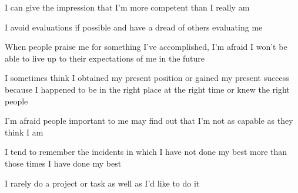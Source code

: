 \documentclass[aspectratio=169]{beamer}
\begin{document}
\begin{frame}
  \begin{center}
    \Huge  I can give the impression that I’m more competent than I really am
  \end{center}
\end{frame}

\begin{frame}
  \begin{center}
    \Huge  I avoid evaluations if possible and have a dread of others evaluating me
  \end{center}
\end{frame}

\begin{frame}
  \begin{center}
    \Huge  When  people  praise  me  for  something  I’ve  accomplished,  I’m  afraid  I  won’t  be able to live up to their expectations of me in the future
  \end{center}
\end{frame}

\begin{frame}
  \begin{center}
    \Huge  I sometimes think I obtained my present position or gained my present success because I happened to be in the right place at the right time or knew the right people
  \end{center}
\end{frame}

\begin{frame}
  \begin{center}
    \Huge  I’m  afraid  people  important  to  me  may  find  out  that  I’m  not  as  capable  as  they  think  I  am
  \end{center}
\end{frame}

\begin{frame}
  \begin{center}
    \Huge I tend to remember the incidents in which I have not done my best more than those times I have done my best
  \end{center}
\end{frame}

\begin{frame}
  \begin{center}
    \Huge  I rarely do a project or task as well as I’d like to do it
  \end{center}
\end{frame}
\end{document}
